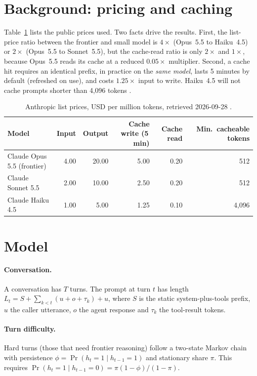 \documentclass[10pt]{article}
\begin{document}
\section{Background: pricing and caching}\label{sec:bg}
Table~\ref{tab:prices} lists the public prices used. Two facts drive the results. First, the list-price ratio between the frontier and small model is $4\times$ (Opus~5.5 to Haiku~4.5) or $2\times$ (Opus~5.5 to Sonnet~5.5), but the cache-read ratio is only $2\times$ and $1\times$, because Opus~5.5 reads its cache at a reduced $0.05\times$ multiplier. Second, a cache hit requires an identical prefix, in practice on the \emph{same model}, lasts 5 minutes by default (refreshed on use), and costs $1.25\times$ input to write. Haiku~4.5 will not cache prompts shorter than 4{,}096 tokens \cite{anthropiccache}.

\begin{table}[h]\centering\small
\caption{Anthropic list prices, USD per million tokens, retrieved 2026-09-28 \cite{anthropicpricing,anthropiccache}.}\label{tab:prices}
\begin{tabular}{lrrrrr}\toprule
Model & Input & Output & Cache write (5\,min) & Cache read & Min.\ cacheable tokens\\\midrule
Claude Opus 5.5 (frontier) & 4.00 & 20.00 & 5.00 & 0.20 & 512\\
Claude Sonnet 5.5 & 2.00 & 10.00 & 2.50 & 0.20 & 512\\
Claude Haiku 4.5 & 1.00 & 5.00 & 1.25 & 0.10 & 4{,}096\\\bottomrule
\end{tabular}\end{table}

\section{Model}\label{sec:model}
\paragraph{Conversation.} A conversation has $T$ turns. The prompt at turn $t$ has length $L_t = S + \sum_{k<t}(u+o+\tau_k) + u$, where $S$ is the static system-plus-tools prefix, $u$ the caller utterance, $o$ the agent response and $\tau_k$ the tool-result tokens.

\paragraph{Turn difficulty.} Hard turns (those that need frontier reasoning) follow a two-state Markov chain with persistence $\phi=\Pr(h_t=1\mid h_{t-1}=1)$ and stationary share $\pi$. This requires $\Pr(h_t=1\mid h_{t-1}=0)=\pi(1-\phi)/(1-\pi)$.
\end{document}
